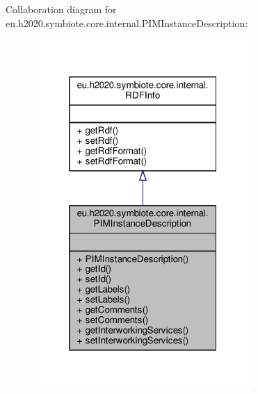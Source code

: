 Collaboration diagram for eu.\+h2020.\+symbiote.\+core.\+internal.\+P\+I\+M\+Instance\+Description\+:\nopagebreak
\begin{figure}[H]
\begin{center}
\leavevmode
\includegraphics[width=236pt]{classeu_1_1h2020_1_1symbiote_1_1core_1_1internal_1_1PIMInstanceDescription__coll__graph}
\end{center}
\end{figure}
